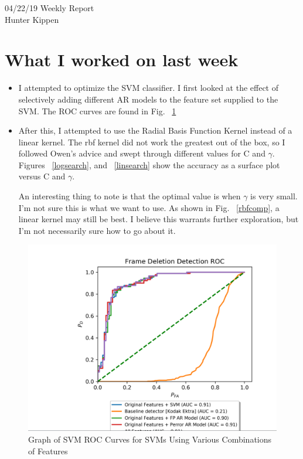 \documentclass[12pt]{article}%
\def\bi{\begin{itemize}     %
\vspace{-0.5em}\setlength\itemsep{0em}}
\begin{document}
\begin{center}
{\LARGE 04/22/19 Weekly Report}\\
\vspace{0.5em}
{\Large Hunter Kippen}
\vspace{0.5em}
\end{center}


\section{What I worked on last week}
\bi
\item I attempted to optimize the SVM classifier. I first looked at the effect of selectively adding different AR models to the feature set supplied to the SVM. The ROC curves are found in Fig. ~\ref{FeatComp}
\item After this, I attempted to use the Radial Basis Function Kernel instead of a linear kernel. The rbf kernel did not work the greatest out of the box, so I followed Owen's advice and swept through different values for C and $\gamma$. Figures ~\ref{logsearch}, and ~\ref{linsearch} show the accuracy as a surface plot versus C and $\gamma$. 

An interesting thing to note is that the optimal value is when $\gamma$ is very small. I'm not sure this is what we want to use. As shown in Fig. ~\ref{rbfcomp}, a linear kernel may still be best. I believe this warrants further exploration, but I'm not necessarily sure how to go about it. 
\end{itemize}


\begin{figure}[htbp]
\centerline{\includegraphics[width=0.9\linewidth]{../Graphs/perror_all_AR_model_comparison.png}}
\caption{Graph of SVM ROC Curves for SVMs Using Various Combinations of Features}
\label{FeatComp}
\end{figure}
\end{document}
